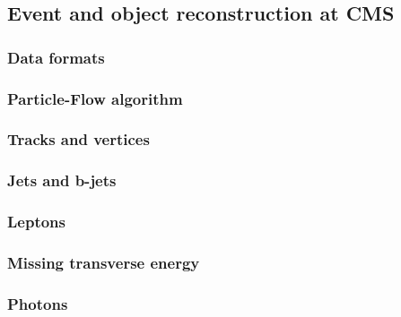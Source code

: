 \newpage

\subsection{Event and object reconstruction at CMS}


\subsubsection{Data formats}
\subsubsection{Particle-Flow algorithm}
\subsubsection{Tracks and vertices}
\subsubsection{Jets and b-jets}
\subsubsection{Leptons}
\subsubsection{Missing transverse energy}
\subsubsection{Photons}

